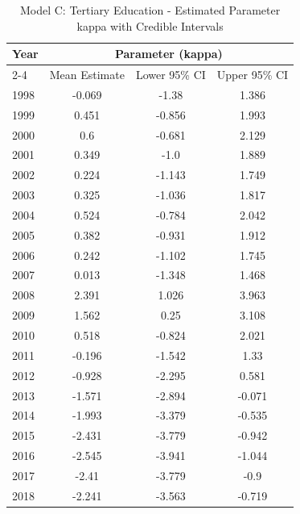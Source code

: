 \begin{landscape}
\begin{table}[htbp]
\centering
\caption{Model C: Tertiary Education - Estimated Parameter kappa  with Credible Intervals}
\label{tab:Fparameters_k12}
\begin{tabular}{@{}lccc@{}}
\toprule
Year & \multicolumn{3}{c}{Parameter (kappa)} \\
\cmidrule(lr){2-4}
      & Mean Estimate & Lower 95\% CI & Upper 95\% CI \\
\midrule
1998 & -0.069 & -1.38 & 1.386 \\
1999 & 0.451 & -0.856 & 1.993 \\
2000 & 0.6 & -0.681 & 2.129 \\
2001 & 0.349 & -1.0 & 1.889 \\
2002 & 0.224 & -1.143 & 1.749 \\
2003 & 0.325 & -1.036 & 1.817 \\
2004 & 0.524 & -0.784 & 2.042 \\
2005 & 0.382 & -0.931 & 1.912 \\
2006 & 0.242 & -1.102 & 1.745 \\
2007 & 0.013 & -1.348 & 1.468 \\
2008 & 2.391 & 1.026 & 3.963 \\
2009 & 1.562 & 0.25 & 3.108 \\
2010 & 0.518 & -0.824 & 2.021 \\
2011 & -0.196 & -1.542 & 1.33 \\
2012 & -0.928 & -2.295 & 0.581 \\
2013 & -1.571 & -2.894 & -0.071 \\
2014 & -1.993 & -3.379 & -0.535 \\
2015 & -2.431 & -3.779 & -0.942 \\
2016 & -2.545 & -3.941 & -1.044 \\
2017 & -2.41 & -3.779 & -0.9 \\
2018 & -2.241 & -3.563 & -0.719 \\
\bottomrule
\end{tabular}
\end{table}
\end{landscape}